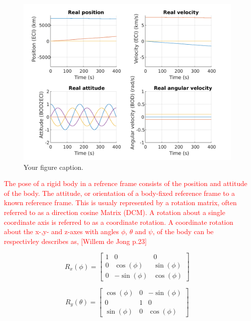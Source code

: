 \begin{figure}[H]
    \centering
    \includegraphics[width=0.8\linewidth]{figures/States.pdf}
    \caption{Your figure caption.}
    \label{fig:3.1}
\end{figure}


\label{sec:modrigid}

\label{sec:kinematics}

\textcolor{red}{The pose of a rigid body in a refrence frame consists of the position and attitude of the body. The attitude, or orientation of a body-fixed reference frame to a
known reference frame. This is usualy represented by a rotation matrix, often referred to as a direction cosine Matrix (DCM). A rotation about a single coordinate axis
is referred to as a coordinate rotation. A coordinate rotation about the x-,y- and z-axes with angles $\phi$, $\theta$ and $\psi$, of the body can be respectivley
describes as, [Willem de Jong p.23]}

\begin{equation}
    R_x(\phi) = \begin{bmatrix} 
        1 & 0 & 0 \\
        0 & \cos(\phi) & \sin(\phi) \\
        0 & -\sin(\phi) & \cos(\phi)
    \end{bmatrix}
    \label{Eq:3.1}
\end{equation}

\begin{equation}
    R_y(\theta) = \begin{bmatrix} 
        \cos(\phi) & 0 & -\sin(\phi) \\
        0 & 1 & 0 \\
        \sin(\phi) & 0  & \cos(\phi)
    \end{bmatrix}
    \label{Eq:3.2}
\end{equation}

